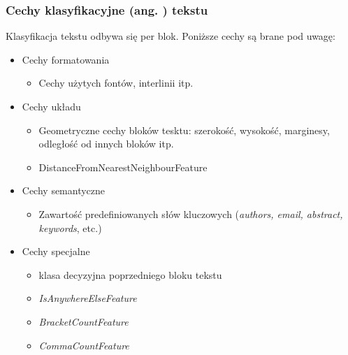 \documentclass[11pt,t]{beamer}
\begin{document}
\begin{frame}
\frametitle{Cechy klasyfikacyjne (ang. ) tekstu}
Klasyfikacja tekstu odbywa się per blok. Poniższe cechy są brane pod uwagę:
\begin{itemize}
\item Cechy formatowania
	\begin{itemize} \item Cechy użytych fontów, interlinii itp. \end{itemize}
\item Cechy układu
	\begin{itemize} \item Geometryczne cechy bloków tesktu: szerokość, wysokość, marginesy, odległość od innych bloków itp. 
	\item DistanceFromNearestNeighbourFeature
	\end{itemize}
\item Cechy semantyczne
	\begin{itemize} \item Zawartość predefiniowanych słów kluczowych (\textit{authors, email, abstract, keywords}, etc.) \end{itemize}
\item Cechy specjalne
\begin{itemize}\item klasa decyzyjna poprzedniego bloku tekstu \item \textit{IsAnywhereElseFeature} \item \textit{BracketCountFeature} \item \textit{CommaCountFeature} \end{itemize}
\end{itemize}
\end{frame}
\end{document}
